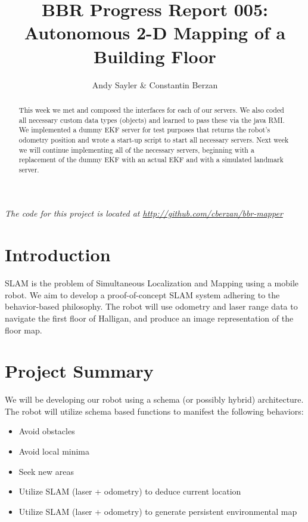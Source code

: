 \documentclass[12pt]{article}
\begin{document}
\title{BBR Progress Report 005:\\ Autonomous 2-D Mapping of a Building Floor}
\author{Andy Sayler \& Constantin Berzan}
\maketitle

\begin{abstract}
This week we met and composed the interfaces for each of our servers. We also
coded all necessary custom data types (objects) and learned to pass these
via the java RMI. We implemented a dummy EKF server for test purposes
that returns the robot's odometry position and wrote a start-up script
to start all necessary servers. Next week we will continue implementing all
of the necessary servers, beginning with a replacement of the dummy EKF
with an actual EKF and with a simulated landmark server.
\end{abstract}

\emph{The code for this project is located at
\url{http://github.com/cberzan/bbr-mapper}}

\section{Introduction}
SLAM is the problem of Simultaneous Localization and Mapping using a mobile
robot.  We aim to develop a proof-of-concept SLAM system adhering to the
behavior-based philosophy.  The robot will use odometry and laser range data to
navigate the first floor of Halligan, and produce an image representation of
the floor map.

\section{Project Summary}

We will be developing our robot using a schema (or possibly hybrid)
architecture. The robot will utilize schema based functions to manifest the
following behaviors:

\begin{itemize}
    \setlength{\itemsep}{0pt}
    \setlength{\parskip}{0pt}
    \setlength{\parsep}{0pt}
    \item Avoid obstacles
    \item Avoid local minima
    \item Seek new areas
    \item Utilize SLAM (laser + odometry) to deduce current location
    \item Utilize SLAM (laser + odometry) to generate persistent environmental
          map
\end{itemize}
\end{document}
